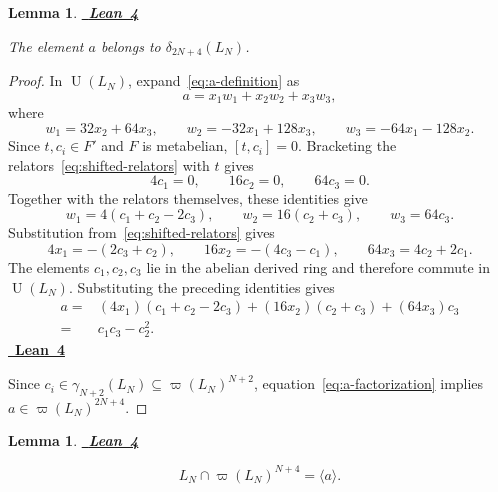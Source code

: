 \documentclass[a4paper,11pt,reqno]{amsart}
\newtheorem{lemma}[theorem]{Lemma}
\theoremstyle{definition}
\newcommand{\leanrepository}{%
  https://github.com/TimmPeterson/lie-algebras/blob/main}
\newcommand{\leanproof}[1]{%
  \leavevmode\unskip\nobreak\hfill
  \mbox{\href{#1}{\normalfont\sffamily\bfseries\footnotesize
    \textcolor{leanblue}{Lean 4}}}%
  \par\nobreak\smallskip\noindent\ignorespaces
}
\newcommand{\U}{\operatorname U}
\begin{document}
\begin{lemma}\label{lem:a-height}
\leanproof{\leanrepository/LieRings/Publication/Results.lean\#L177-L182}
The element $a$ belongs to $\delta_{2N+4}(L_N)$.
\end{lemma}

\begin{proof}
In $\U(L_N)$, expand~\eqref{eq:a-definition} as
\[
 a=x_1w_1+x_2w_2+x_3w_3,
\]
where
\[
 w_1=32x_2+64x_3,
 \qquad
 w_2=-32x_1+128x_3,
 \qquad
 w_3=-64x_1-128x_2.
\]
Since $t,c_i\in F'$ and $F$ is metabelian, $[t,c_i]=0$.  Bracketing the
relators~\eqref{eq:shifted-relators} with $t$ gives
\[
 4c_1=0,
 \qquad
 16c_2=0,
 \qquad
 64c_3=0.
\]
Together with the relators themselves, these identities give
\[
 w_1=4(c_1+c_2-2c_3),
 \qquad
 w_2=16(c_2+c_3),
 \qquad
 w_3=64c_3.
\]
Substitution from~\eqref{eq:shifted-relators} gives
\[
 4x_1=-(2c_3+c_2),
 \qquad
 16x_2=-(4c_3-c_1),
 \qquad
 64x_3=4c_2+2c_1.
\]
The elements $c_1,c_2,c_3$ lie in the abelian derived ring and therefore
commute in $\U(L_N)$.  Substituting the preceding identities gives
\begin{equation}\label{eq:a-factorization}
 \begin{aligned}
 a={}&(4x_1)(c_1+c_2-2c_3)
      +(16x_2)(c_2+c_3)+(64x_3)c_3\\
   ={}&c_1c_3-c_2^2.
 \end{aligned}
\end{equation}
\leanproof{\leanrepository/LieRings/Publication/Results.lean\#L167-L175}
Since $c_i\in\gamma_{N+2}(L_N)\subseteq\varpi(L_N)^{N+2}$,
equation~\eqref{eq:a-factorization} implies
$a\in\varpi(L_N)^{2N+4}$.
\end{proof}

\begin{lemma}\label{lem:critical-normal-form}
\leanproof{\leanrepository/LieRings/Publication/Results.lean\#L184-L191}
\[
                         L_N\cap\varpi(L_N)^{N+4}=\langle a\rangle.
\]
\end{lemma}
\end{document}
